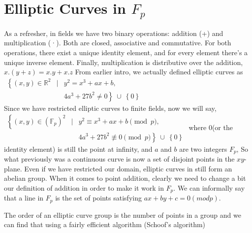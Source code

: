 \documentclass{article}
\begin{document}
\section{Elliptic Curves in $F_p$}
As a refresher, in fields we have two binary operations: addition (+) and multiplication (·). Both are closed, associative and commutative. For both operations, there exist a unique identity element, and for every element there's a unique inverse element. Finally, multiplication is distributive over the addition, $x.(y+z)=x.y+x.z$
From earlier intro, we actually defined elliptic curves as  $\begin{array}{rcl}
  \left\{(x, y) \in \mathbb{R}^2 \right. & \left. | \right. & \left. y^2 = x^3 + ax + b, \right. \\
  & & \left. 4a^3 + 27b^2 \ne 0\right\}\ \cup\ \left\{0\right\}
\end{array}$\\
Since we have restricted elliptic curves to finite fields, now we will say, \\
$\begin{array}{rcl}
  \left\{(x, y) \in (\mathbb{F}_p)^2 \right. & \left. | \right. & \left. y^2 \equiv x^3 + ax + b \pmod{p}, \right. \\
  & & \left. 4a^3 + 27b^2 \not\equiv 0 \pmod{p}\right\}\ \cup\ \left\{0\right\}
\end{array}$ where 0(or the identity element) is still the point at infinity, and $a$ and $b$  are two integers $F_p$, So what previously was a continuous curve is now a set of disjoint points in the $xy$-plane. Even if we have restricted our domain, elliptic curves in still form an abelian group. When it comes to point addition, clearly we need to change a bit our definition of addition in order to make it work in $F_p$. We can informally say that a line in $F_p$ is the set of points satisfying $ax+by+c=0(mod p)$.

The order of an elliptic curve group is the number of points in a group and we can find that using a fairly efficient algorithm (Schoof's algorithm)
\end{document}
